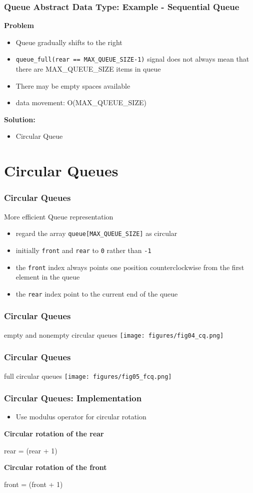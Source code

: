 \documentclass[newPxFont,sthlmFooter,nooffset]{beamer}
\begin{document}
\begin{frame}[t, fragile]
  \frametitle{Queue Abstract Data Type: Example - Sequential Queue}
\textbf{Problem}
\begin{itemize}
\item Queue gradually shifts to the right
\item \texttt{queue\_full(rear == MAX\_QUEUE\_SIZE-1)} signal does not
  always mean that there are MAX\_QUEUE\_SIZE items in queue
\item There may be empty spaces available
\item data movement: O(MAX\_QUEUE\_SIZE)
\end{itemize}
\bigskip
\textbf{Solution:}
  \begin{itemize}
  \item<2-> Circular Queue
  \end{itemize}
\end{frame}


\section{Circular Queues} 
\begin{frame}[t]
  \frametitle{Circular Queues}
More efficient Queue representation
\begin{itemize}
\item  regard the array \texttt{queue[MAX\_QUEUE\_SIZE]} as circular
\item initially \texttt{front} and \texttt{rear} to \texttt{0} rather than \texttt{-1}
\item the \texttt{front} index always points one position counterclockwise from the first element in the queue
\item the \texttt{rear} index point to the current end of the queue
\end{itemize}
\end{frame}

\begin{frame}[t]
  \frametitle{Circular Queues}
empty and nonempty circular queues
\texttt{[image: figures/fig04\_cq.png]}
\end{frame}

\begin{frame}[t]
  \frametitle{Circular Queues}
full circular queues
\texttt{[image: figures/fig05\_fcq.png]}
\end{frame}

\begin{frame}[t, fragile]
  \frametitle{Circular Queues: Implementation}
  \begin{itemize}
  \item Use modulus operator for circular rotation
  \end{itemize}
\bigskip
\textbf{Circular rotation of the rear}
\begin{codedef}
rear = (rear + 1) %
\end{codedef}

\textbf{Circular rotation of the front}
\begin{codedef}
front = (front + 1) %
\end{codedef}
\end{frame}
\end{document}
